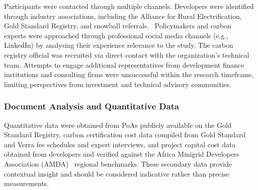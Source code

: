 \begin{table}[t]
	\centering
	\caption{\textbf{Overview of Interview Participants.} All interviews conducted via virtual meetings.}
	\label{tab:participants}
\end{table}

Participants were contacted through multiple channels. Developers were identified through industry associations, including the Alliance for Rural Electrification, Gold Standard Registry, and snowball referrals.~\cite{bryman2016} Policymakers and carbon experts were approached through professional social media channels (e.g., LinkedIn) by analysing their experience relevance to the study. The carbon registry official was recruited via direct contact with the organization's technical team. Attempts to engage additional representatives from development finance institutions and consulting firms were unsuccessful within the research timeframe, limiting perspectives from investment and technical advisory communities.

\subsubsection{Document Analysis and Quantitative Data}
\label{subsec:doc-analysis}
Quantitative data were obtained from PoAs publicly available on the Gold Standard Registry, carbon certification cost data compiled from Gold Standard and Verra fee schedules and expert interviews, and project capital cost data obtained from developers and verified against the Africa Minigrid Developers Association (AMDA)~\cite{amda-bam} regional benchmarks. These secondary data provide contextual insight and should be considered indicative rather than precise measurements.

